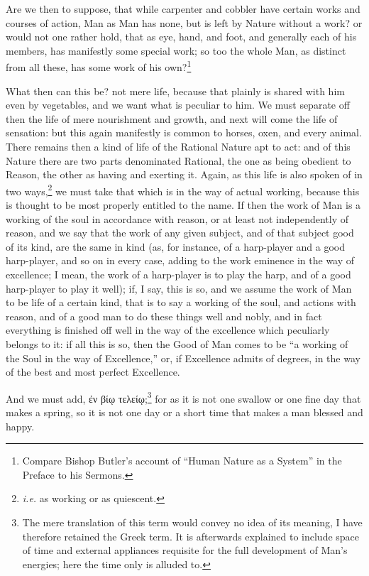 Are we then to suppose, that while carpenter and cobbler have certain works and
courses of action, Man as Man has none, but is left by Nature without a work?
or would not one rather hold, that as eye, hand, and foot, and generally each
of his members, has manifestly some special work; so too the whole Man, as
distinct from all these, has some work of his own?\footnote{Compare Bishop Butler’s account of “Human Nature as a System”
in the Preface to his Sermons.}

What then can this be? not mere life, because that plainly is shared with him
even by vegetables, and we want what is peculiar to him. We must separate off
then the life of mere nourishment and growth, and next will come the life of
sensation: but this again manifestly is common to horses, oxen, and every
animal. There remains then a kind of life of the Rational Nature apt to act:
and of this Nature there are two parts denominated Rational, the one as being
obedient to Reason, the other as having and exerting it. Again, as this life is
also spoken of in two ways,\footnote{\emph{i.e.} as working or as quiescent.}
we must take that which is in the way of actual working, because this is
thought to be most properly entitled to the name. If then the work of Man is a
working of the soul in accordance with reason, or at least not independently of
reason, and we say that the work of any given subject, and of that subject good
of its kind, are the same in kind (as, for instance, of a harp-player and a
good harp-player, and so on in every case, adding to the work eminence in the
way of excellence; I mean, the work of a harp-player is to play the harp, and
of a good harp-player to play it well); if, I say, this is so, and we assume
the work of Man to be life of a certain kind, that is to say a working of the
soul, and actions with reason, and of a good man to do these things well and
nobly, and in fact everything is finished off well in the way of the excellence
which peculiarly belongs to it: if all this is so, then the Good of Man comes
to be “a working of the Soul in the way of Excellence,” or, if
Excellence admits of degrees, in the way of the best and most perfect
Excellence.

And we must add, ἐν βίῳ
τελείῳ;\footnote{The mere translation of this term would convey no idea of its meaning, I have
therefore retained the Greek term. It is afterwards explained to include space
of time and external appliances requisite for the full development of
Man’s energies; here the time only is alluded to.}
for as it is not one swallow or one fine day that makes a spring, so it is not
one day or a short time that makes a man blessed and happy.

